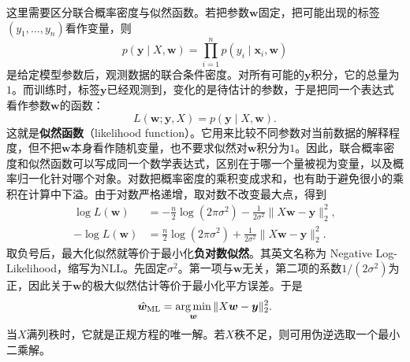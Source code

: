 这里需要区分联合概率密度与似然函数。若把参数$\bm w$固定，把可能出现的标签$(y_1,\ldots,y_n)$看作变量，则
\begin{equation}
 p(\bm y\mid X,\bm w)
 =\prod_{i=1}^n p(y_i\mid\bm x_i,\bm w)
\end{equation}
是给定模型参数后，观测数据的联合条件密度。对所有可能的$\bm y$积分，它的总量为$1$。而训练时，标签$\bm y$已经观测到，变化的是待估计的参数，于是把同一个表达式看作参数$\bm w$的函数：
\begin{equation}
 L(\bm w;\bm y,X)=p(\bm y\mid X,\bm w).
\end{equation}
这就是\textbf{似然函数}（likelihood function）。它用来比较不同参数对当前数据的解释程度，但不把$\bm w$本身看作随机变量，也不要求似然对$\bm w$积分为$1$。因此，联合概率密度和似然函数可以写成同一个数学表达式，区别在于哪一个量被视为变量，以及概率归一化针对哪个对象。对数把概率密度的乘积变成求和，也有助于避免很小的乘积在计算中下溢。由于对数严格递增，取对数不改变最大点，得到
\begin{align}
 \log L(\bm w)
 &=-\frac n2\log(2\pi\sigma^2)
 -\frac1{2\sigma^2}\|X\bm w-\bm y\|_2^2,\\
 -\log L(\bm w)
 &=\frac n2\log(2\pi\sigma^2)
 +\frac1{2\sigma^2}\|X\bm w-\bm y\|_2^2.
 \label{eq:linear-negative-log-likelihood}
\end{align}
取负号后，最大化似然就等价于最小化\textbf{负对数似然}。其英文名称为 Negative Log-Likelihood，缩写为NLL。先固定$\sigma^2$。第一项与$\bm w$无关，第二项的系数$1/(2\sigma^2)$为正，因此关于$\bm w$的极大似然估计等价于最小化平方误差。于是
\begin{equation}
 \hat{\bm w}_{\mathrm{ML}}
 =\mathop{\mathrm{arg\,min}}_{\bm w}\|X\bm w-\bm y\|_2^2.
\end{equation}
当$X$满列秩时，它就是正规方程的唯一解。若$X$秩不足，则可用伪逆选取一个最小二乘解。

